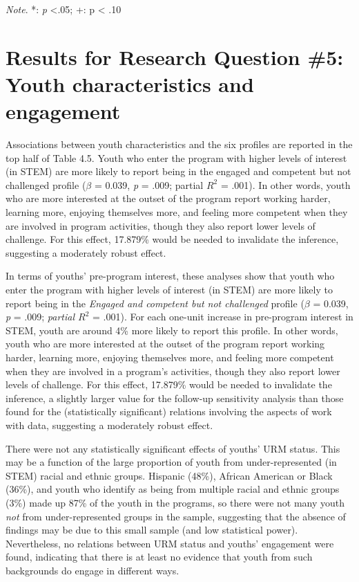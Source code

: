 \documentclass[]{msu-thesis}
\theoremstyle{definition}
\theoremstyle{definition}
\theoremstyle{definition}
\theoremstyle{remark}
\begin{document}
\emph{Note}. *: \emph{p} \textless{}.05; +: p \textless{} .10

\section{Results for Research Question \#5: Youth characteristics and
engagement}\label{results-for-research-question-5-youth-characteristics-and-engagement}

Associations between youth characteristics and the six profiles are
reported in the top half of Table 4.5. Youth who enter the program with
higher levels of interest (in STEM) are more likely to report being in
the engaged and competent but not challenged profile (\(\beta\) = 0.039,
\emph{p} = .009; partial \(R^2\) = .001). In other words, youth who are
more interested at the outset of the program report working harder,
learning more, enjoying themselves more, and feeling more competent when
they are involved in program activities, though they also report lower
levels of challenge. For this effect, 17.879\% would be needed to
invalidate the inference, suggesting a moderately robust effect.

In terms of youths' pre-program interest, these analyses show that youth
who enter the program with higher levels of interest (in STEM) are more
likely to report being in the \emph{Engaged and competent but not
challenged} profile (\(\beta\) = 0.039, \emph{p} = .009; \emph{partial
\(R^2\)} = .001). For each one-unit increase in pre-program interest in
STEM, youth are around 4\% more likely to report this profile. In other
words, youth who are more interested at the outset of the program report
working harder, learning more, enjoying themselves more, and feeling
more competent when they are involved in a program's activities, though
they also report lower levels of challenge. For this effect, 17.879\%
would be needed to invalidate the inference, a slightly larger value for
the follow-up sensitivity analysis than those found for the
(statistically significant) relations involving the aspects of work with
data, suggesting a moderately robust effect.

There were not any statistically significant effects of youths' URM
status. This may be a function of the large proportion of youth from
under-represented (in STEM) racial and ethnic groups. Hispanic (48\%),
African American or Black (36\%), and youth who identify as being from
multiple racial and ethnic groups (3\%) made up 87\% of the youth in the
programs, so there were not many youth \emph{not} from under-represented
groups in the sample, suggesting that the absence of findings may be due
to this small sample (and low statistical power). Nevertheless, no
relations between URM status and youths' engagement were found,
indicating that there is at least no evidence that youth from such
backgrounds do engage in different ways.
\end{document}
